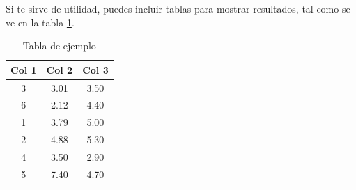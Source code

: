 Si te sirve de utilidad,  puedes incluir tablas para mostrar resultados, tal como se ve en la tabla \ref{tab:sampleTable}.


\begin{table}
	\centering
	\begin{tabular}{c|c|c}
		\textbf{Col 1} & \textbf{Col 2} & \textbf{Col 3} \\
		\hline\hline
		3 & 3.01 & 3.50\\
		6 & 2.12 & 4.40\\
		1 & 3.79 & 5.00\\
		2 & 4.88 & 5.30\\
		4 & 3.50 & 2.90\\
		5 & 7.40 & 4.70\\
		\hline
	\end{tabular}
	\caption{Tabla de ejemplo}
	\label{tab:sampleTable}
\end{table}
